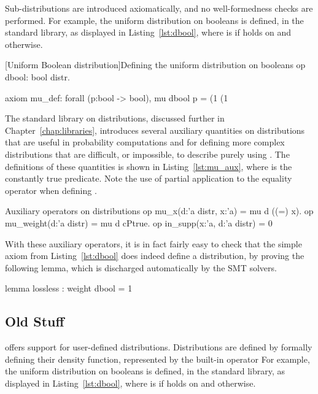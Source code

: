 Sub-distributions are introduced axiomatically, and no well-formedness checks
are performed. For example, the uniform distribution on booleans is defined, in
the standard library, as displayed in Listing~\ref{lst:dbool}, where
 is  if  holds on  and
 otherwise.

\begin{easycrypt}[label={lst:dbool}]{[Uniform Boolean distribution]Defining the uniform distribution on booleans}
op dbool: bool distr.

axiom mu_def: forall (p:bool -> bool), 
  mu dbool p =
    (1%
    (1%
\end{easycrypt}

The standard library on distributions, discussed further in
Chapter~\ref{chap:libraries}, introduces several auxiliary quantities on
distributions that are useful in probability computations and for defining more
complex distributions that are difficult, or impossible, to describe purely
using . The definitions of these quantities is shown in
Listing~\ref{lst:mu_aux}, where  is the constantly true predicate.
Note the use of partial application to the equality operator when defining
.

\begin{easycrypt}[label={lst:mu_aux}]{Auxiliary operators on distributions}
op mu_x(d:'a distr, x:'a) = mu d ((=) x).
op mu_weight(d:'a distr) = mu d cPtrue.
op in_supp(x:'a, d:'a distr) = 0%
\end{easycrypt}

With these auxiliary operators, it is in fact fairly easy to check that the simple axiom from Listing~\ref{lst:dbool} does indeed define a distribution, by proving the following lemma, which is discharged automatically by the SMT solvers.

\begin{easycrypt}[]{}
lemma lossless : weight dbool = 1%
\end{easycrypt}

\subsection{Old Stuff}
\EC offers support for user-defined distributions. Distributions are defined by
formally defining their density function, represented by the built-in operator
 For example, the uniform
distribution on booleans is defined, in the standard library, as displayed in
Listing~\ref{lst:dbool}, where  is  if 
holds on  and  otherwise.

